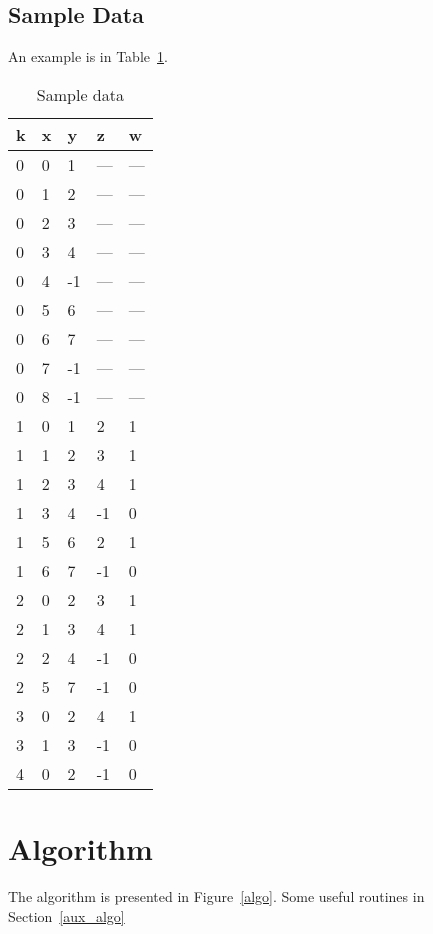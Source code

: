 \subsection{Sample Data}
An example is in Table~\ref{example_extend}. 
\begin{table}[hp]
\centering
\begin{tabular} {|l|l|l|l|l|} \hline \hline
{\bf k} & {\bf x} & {\bf y} & {\bf z} & {\bf w} \\ \hline
0 & 0 & 1  & --- & --- \\ \hline
0 & 1 & 2  & --- & --- \\ \hline
0 & 2 & 3  & --- & --- \\ \hline
0 & 3 & 4  & --- & --- \\ \hline
0 & 4 & -1 & --- & --- \\\hline
0 & 5 & 6  &  --- & --- \\\hline
0 & 6 & 7  &  --- & --- \\\hline
0 & 7 & -1 &  --- & --- \\\hline
0 & 8 & -1 &  --- & --- \\\hline
\hline  \hline
1 & 0 & 1  & 2  & 1 \\ \hline
1 & 1 & 2  & 3  & 1 \\ \hline
1 & 2 & 3  & 4  & 1 \\ \hline
1 & 3 & 4  & -1 & 0 \\ \hline
1 & 5 & 6  & 2  & 1 \\ \hline
1 & 6 & 7  & -1 & 0 \\ \hline
\hline  \hline
2 & 0 & 2 & 3 & 1 \\ \hline
2 & 1 & 3 & 4 & 1 \\ \hline
2 & 2 & 4 & -1 & 0 \\ \hline
2 & 5 & 7 & -1 & 0 \\ \hline
\hline  \hline
3 & 0 & 2 & 4 & 1 \\ \hline
3 & 1 & 3 & -1 & 0 \\ \hline
\hline  \hline
4 & 0 & 2 & -1 & 0 \\ \hline
\end{tabular}
\caption{Sample data}
\label{example_extend}
\end{table}


\section{Algorithm}

The algorithm is presented in Figure~\ref{algo}. Some useful routines in
Section~\ref{aux_algo}
